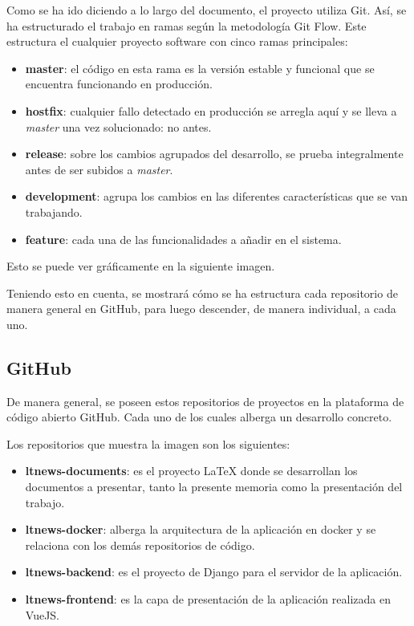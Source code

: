 Como se ha ido diciendo a lo largo del documento, el proyecto utiliza Git. Así, se ha estructurado el trabajo en ramas según la metodología Git Flow. Este estructura el cualquier proyecto software con cinco ramas principales:

\begin{itemize}
    \item \textbf{master}: el código en esta rama es la versión estable y funcional que se encuentra funcionando en producción.
    \item \textbf{hostfix}: cualquier fallo detectado en producción se arregla aquí y se lleva a \textit{master} una vez solucionado: no antes.
    \item \textbf{release}: sobre los cambios agrupados del desarrollo, se prueba integralmente antes de ser subidos a \textit{master}.
    \item \textbf{development}: agrupa los cambios en las diferentes características que se van trabajando.
    \item \textbf{feature}: cada una de las funcionalidades a añadir en el sistema.
\end{itemize}

Esto se puede ver gráficamente en la siguiente imagen.


Teniendo esto en cuenta, se mostrará cómo se ha estructura cada repositorio de manera general en GitHub, para luego descender, de manera individual, a cada uno.

\subsection{GitHub}

De manera general, se poseen estos repositorios de proyectos en la plataforma de código abierto GitHub. Cada uno de los cuales alberga un desarrollo concreto.


Los repositorios que muestra la imagen son los siguientes:

\begin{itemize}
    \item \textbf{ltnews-documents}: es el proyecto LaTeX donde se desarrollan los documentos a presentar, tanto la presente memoria como la presentación del trabajo.
    \item \textbf{ltnews-docker}: alberga la arquitectura de la aplicación en docker y se relaciona con los demás repositorios de código.
    \item \textbf{ltnews-backend}: es el proyecto de Django para el servidor de la aplicación.
    \item \textbf{ltnews-frontend}: es la capa de presentación de la aplicación
     realizada en VueJS.
\end{itemize}

